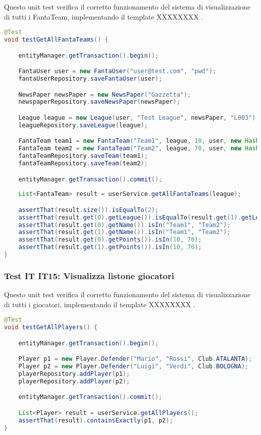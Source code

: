 Questo unit test verifica il corretto funzionamento del sistema di visualizzazione di tutti i FantaTeam,
implementando il template XXXXXXXX .

\begin{lstlisting}[language=Java]
@Test
void testGetAllFantaTeams() {

	entityManager.getTransaction().begin();

	FantaUser user = new FantaUser("user@test.com", "pwd");
	fantaUserRepository.saveFantaUser(user);

	NewsPaper newsPaper = new NewsPaper("Gazzetta");
	newspaperRepository.saveNewsPaper(newsPaper);

	League league = new League(user, "Test League", newsPaper, "L003");
	leagueRepository.saveLeague(league);

	FantaTeam team1 = new FantaTeam("Team1", league, 10, user, new HashSet<>());
	FantaTeam team2 = new FantaTeam("Team2", league, 70, user, new HashSet<>());
	fantaTeamRepository.saveTeam(team1);
	fantaTeamRepository.saveTeam(team2);

	entityManager.getTransaction().commit();
		
	List<FantaTeam> result = userService.getAllFantaTeams(league);

	assertThat(result.size()).isEqualTo(2);
	assertThat(result.get(0).getLeague()).isEqualTo(result.get(1).getLeague());
	assertThat(result.get(0).getName()).isIn("Team1", "Team2");
	assertThat(result.get(1).getName()).isIn("Team1", "Team2");
	assertThat(result.get(0).getPoints()).isIn(10, 70);
	assertThat(result.get(1).getPoints()).isIn(10, 70);
}
\end{lstlisting}


\subsubsection{Test IT IT15: Visualizza listone giocatori} \label{IT15}

Questo unit test verifica il corretto funzionamento del sistema di visualizzazione di tutti i giocatori,
implementando il template XXXXXXXX .

\begin{lstlisting}[language=Java]
@Test
void testGetAllPlayers() {

	entityManager.getTransaction().begin();

	Player p1 = new Player.Defender("Mario", "Rossi", Club.ATALANTA);
	Player p2 = new Player.Defender("Luigi", "Verdi", Club.BOLOGNA);
	playerRepository.addPlayer(p1);
	playerRepository.addPlayer(p2);

	entityManager.getTransaction().commit();

	List<Player> result = userService.getAllPlayers();
	assertThat(result).containsExactly(p1, p2);
}
\end{lstlisting}


